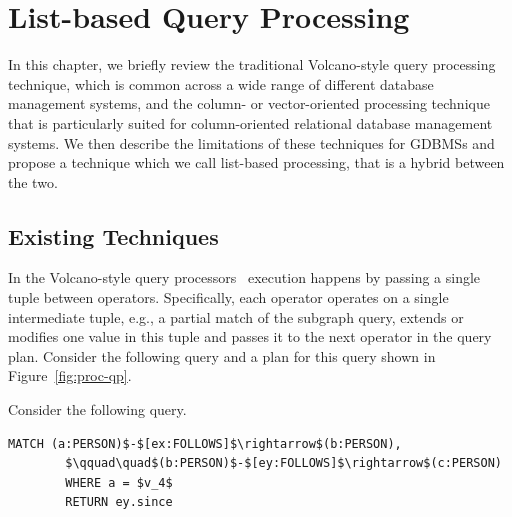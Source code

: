 \chapter{List-based Query Processing}
\label{list-based-processing}

In this chapter, we briefly review the traditional Volcano-style query processing technique, which is common across a wide range of different database management systems, and the column- or vector-oriented processing technique that is particularly suited for column-oriented relational database management systems. We then describe the limitations of these techniques for GDBMSs and propose a technique which we call list-based processing, that is a hybrid between the two.

\section{Existing Techniques}
\label{sec:existing-techniques}
In the Volcano-style query processors~\cite{volcano} execution happens by passing a single tuple between operators. Specifically, each operator operates on a single intermediate tuple, e.g., a partial match of the subgraph query,  extends or modifies one value in this tuple and passes it to the next operator in the query plan.  Consider the following query and a plan for this query shown in Figure~\ref{fig:proc-qp}.

\begin{example}
	\label{ex:proc-example}
	Consider the following query. 
	{\em 
		\begin{lstlisting}[numbers=none,  showstringspaces=false,belowskip=0pt ]
		MATCH (a:PERSON)$-$[ex:FOLLOWS]$\rightarrow$(b:PERSON),
		$\qquad\quad$(b:PERSON)$-$[ey:FOLLOWS]$\rightarrow$(c:PERSON)
		WHERE a = $v_4$
		RETURN ey.since\end{lstlisting}
	}
\end{example}

